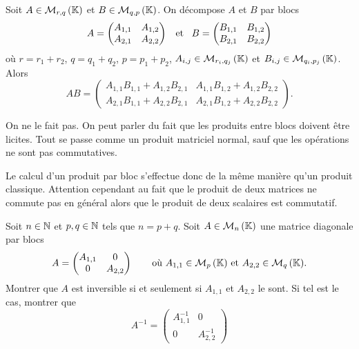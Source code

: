 \documentclass{magnolia}
\begin{document}
  
\begin{proposition}[utile=-3]
  Soit $A\in\mathcal{M}_{r,q}\left(\mathbb{K}\right)$ et $B\in\mathcal{M}_{q,p}\left(\mathbb{K}\right)$. On décompose $A$ et $B$ par blocs 
  \[A=
    \begin{pmatrix}
    A_{1,1} & A_{1,2}\\
    A_{2,1} & A_{2,2}
    \end{pmatrix} \quad\!\text{et}\quad\!
   B=
    \begin{pmatrix}
    B_{1,1} & B_{1,2}\\
    B_{2,1} & B_{2,2}
    \end{pmatrix}\]
où $r=r_1+r_2$, $q=q_1+q_2$, $p=p_1+p_2$, $A_{i,j}\in\mathcal{M}_{r_i,q_j}\left(\mathbb{K}\right)$ et $B_{i,j}\in\mathcal{M}_{q_i,p_j}\left(\mathbb{K}\right)$. Alors
  \[AB=
    \begin{pmatrix}
    A_{1,1}B_{1,1}+A_{1,2}B_{2,1} & A_{1,1}B_{1,2}+A_{1,2}B_{2,2}\\
    A_{2,1}B_{1,1}+A_{2,2}B_{2,1} & A_{2,1}B_{1,2}+A_{2,2}B_{2,2}
    \end{pmatrix}.\]
  \end{proposition}
  
  \begin{preuve}
  On ne le fait pas. On peut parler du fait que les produits entre blocs doivent être licites. Tout se passe comme un produit matriciel normal, sauf que les opérations ne sont pas commutatives.
  \end{preuve}

\begin{remarqueUnique}
\remarque Le calcul d'un produit par bloc s'effectue donc de la même manière qu'un produit classique.
  Attention cependant au fait que le produit de deux matrices ne commute pas en général alors que le produit
  de deux scalaires est commutatif.
\end{remarqueUnique}
\vspace{2ex}
\begin{exoUnique}
  \exo Soit $n\in\mathbb{N}$ et $p,q\in\mathbb{N}$ tels que $n=p+q$. Soit $A\in\mathcal{M}_{n}\left(\mathbb{K}\right)$
    une matrice diagonale par blocs
    \[A=
      \begin{pmatrix}
      A_{1,1} & 0\\
      0 & A_{2,2}
    \end{pmatrix} \qquad \text{où $A_{1,1}\in\mathcal{M}_{p}\left(\mathbb{K}\right)$ et $A_{2,2}\in\mathcal{M}_{q}\left(\mathbb{K}\right)$}.\]
    Montrer que $A$ est inversible si et seulement si $A_{1,1}$ et $A_{2,2}$ le
    sont. Si tel est le cas, montrer que
    \[A^{-1}=
      \begin{pmatrix}
      A_{1,1}^{-1} & 0\\
      0 & A_{2,2}^{-1}
    \end{pmatrix}\]
  \end{exoUnique}
\end{document}
